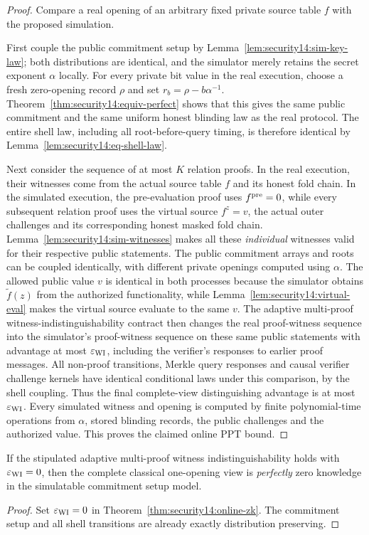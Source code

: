 \begin{proof}
Compare a real opening of
an arbitrary fixed private
source table $f$ with the
proposed simulation.

First couple the
public commitment setup by
Lemma~\ref{lem:security14:sim-key-law};
both distributions are
identical, and the
simulator merely retains
the secret exponent
$\alpha$ locally.
For every private bit
value in the real
execution, choose a fresh
zero-opening record
$\rho$ and set
$r_b=\rho-b\alpha^{-1}$.
Theorem~\ref{thm:security14:equiv-perfect}
shows that this gives the
same public commitment
and the same uniform
honest blinding law
as the real protocol.
The entire shell law,
including all
root-before-query timing,
is therefore identical
by Lemma~\ref{lem:security14:eq-shell-law}.

Next consider the sequence
of at most $K$ relation
proofs. In the real
execution, their witnesses
come from the actual
source table $f$ and
its honest fold chain.
In the simulated
execution, the pre-evaluation
proof uses $f^{\rm pre}=0$,
while every subsequent
relation proof uses the
virtual source $f^z=v$,
the actual outer
challenges and its
corresponding honest
masked fold chain.
Lemma~\ref{lem:security14:sim-witnesses}
makes all these
\emph{individual} witnesses
valid for their respective
public statements.
The public commitment
arrays and roots can be
coupled identically,
with different private
openings computed using
$\alpha$. The allowed
public value $v$ is
identical in both
processes because the
simulator obtains
$\widetilde f(z)$ from
the authorized
functionality, while
Lemma~\ref{lem:security14:virtual-eval}
makes the virtual
source evaluate to
the same $v$.
The adaptive multi-proof
witness-indistinguishability
contract then changes
the real proof-witness
sequence into the
simulator's proof-witness
sequence on these same
public statements with
advantage at most
$\varepsilon_{\rm WI}$,
including the verifier's
responses to earlier
proof messages.
All non-proof
transitions, Merkle
query responses and
causal verifier
challenge kernels have
identical conditional
laws under this
comparison, by the
shell coupling.
Thus the final
complete-view
distinguishing
advantage is at most
$\varepsilon_{\rm WI}$.
Every simulated
witness and opening
is computed by finite
polynomial-time
operations from
$\alpha$, stored
blinding records, the
public challenges and
the authorized value.
This proves the claimed
online PPT bound.
\end{proof}

\begin{corollary}\label{cor:security14:perfect-wi}
If the stipulated
adaptive multi-proof
witness indistinguishability
holds with
$\varepsilon_{\rm WI}=0$,
then the complete
classical one-opening
view is \emph{perfectly}
zero knowledge in the
simulatable commitment
setup model.
\end{corollary}
\begin{proof}
Set
$\varepsilon_{\rm WI}=0$
in
Theorem~\ref{thm:security14:online-zk}.
The commitment setup
and all shell transitions
are already exactly
distribution preserving.
\end{proof}

